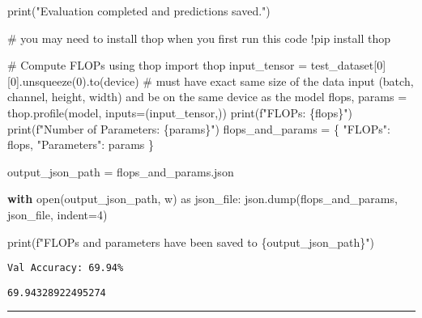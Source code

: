 \documentclass[
  letterpaper,
  DIV=11,
  numbers=noendperiod]{scrartcl}
\newenvironment{Shaded}{\begin{snugshade}}{\end{snugshade}}
\newcommand{\BuiltInTok}[1]{\textcolor[rgb]{0.00,0.23,0.31}{#1}}
\newcommand{\CommentTok}[1]{\textcolor[rgb]{0.37,0.37,0.37}{#1}}
\newcommand{\ControlFlowTok}[1]{\textcolor[rgb]{0.00,0.23,0.31}{\textbf{#1}}}
\newcommand{\DecValTok}[1]{\textcolor[rgb]{0.68,0.00,0.00}{#1}}
\newcommand{\ImportTok}[1]{\textcolor[rgb]{0.00,0.46,0.62}{#1}}
\newcommand{\NormalTok}[1]{\textcolor[rgb]{0.00,0.23,0.31}{#1}}
\newcommand{\OperatorTok}[1]{\textcolor[rgb]{0.37,0.37,0.37}{#1}}
\newcommand{\SpecialCharTok}[1]{\textcolor[rgb]{0.37,0.37,0.37}{#1}}
\newcommand{\SpecialStringTok}[1]{\textcolor[rgb]{0.13,0.47,0.30}{#1}}
\newcommand{\StringTok}[1]{\textcolor[rgb]{0.13,0.47,0.30}{#1}}
\begin{document}
\begin{Shaded}
\begin{Highlighting}[]
\BuiltInTok{print}\NormalTok{(}\StringTok{"Evaluation completed and predictions saved."}\NormalTok{)}

\CommentTok{\# you may need to install thop when you first run this code}
\OperatorTok{!}\NormalTok{pip install thop}

\CommentTok{\# Compute FLOPs using thop}
\ImportTok{import}\NormalTok{ thop}
\NormalTok{input\_tensor }\OperatorTok{=}\NormalTok{ test\_dataset[}\DecValTok{0}\NormalTok{][}\DecValTok{0}\NormalTok{].unsqueeze(}\DecValTok{0}\NormalTok{).to(device) }\CommentTok{\# must have exact same size of the data input (batch, channel, height, width) and be on the same device as the model}
\NormalTok{flops, params }\OperatorTok{=}\NormalTok{ thop.profile(model, inputs}\OperatorTok{=}\NormalTok{(input\_tensor,))}
\BuiltInTok{print}\NormalTok{(}\SpecialStringTok{f"FLOPs: }\SpecialCharTok{\{}\NormalTok{flops}\SpecialCharTok{\}}\SpecialStringTok{"}\NormalTok{)}
\BuiltInTok{print}\NormalTok{(}\SpecialStringTok{f"Number of Parameters: }\SpecialCharTok{\{}\NormalTok{params}\SpecialCharTok{\}}\SpecialStringTok{"}\NormalTok{)}
\NormalTok{flops\_and\_params }\OperatorTok{=}\NormalTok{ \{}
    \StringTok{"FLOPs"}\NormalTok{: flops,}
    \StringTok{"Parameters"}\NormalTok{: params}
\NormalTok{\}}

\NormalTok{output\_json\_path }\OperatorTok{=} \StringTok{\textquotesingle{}flops\_and\_params.json\textquotesingle{}}

\ControlFlowTok{with} \BuiltInTok{open}\NormalTok{(output\_json\_path, }\StringTok{\textquotesingle{}w\textquotesingle{}}\NormalTok{) }\ImportTok{as}\NormalTok{ json\_file:}
\NormalTok{    json.dump(flops\_and\_params, json\_file, indent}\OperatorTok{=}\DecValTok{4}\NormalTok{)}

\BuiltInTok{print}\NormalTok{(}\SpecialStringTok{f"FLOPs and parameters have been saved to }\SpecialCharTok{\{}\NormalTok{output\_json\_path}\SpecialCharTok{\}}\SpecialStringTok{"}\NormalTok{)}
\end{Highlighting}
\end{Shaded}

\begin{verbatim}
Val Accuracy: 69.94%
\end{verbatim}

\label{prob1}
\begin{verbatim}
69.94328922495274
\end{verbatim}

\begin{center}\rule{0.5\linewidth}{0.5pt}\end{center}
\end{document}
